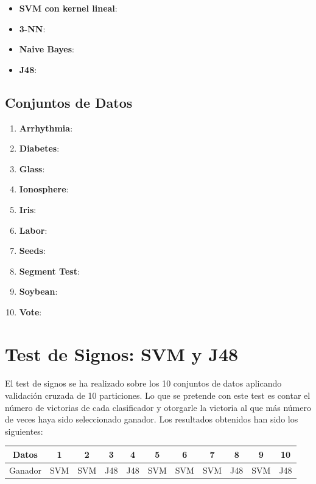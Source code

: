 \documentclass[10pt, a4paper,spanish]{article}
\begin{document}
			\begin{itemize}
				\item \textbf{SVM con kernel lineal}:
				\item \textbf{3-NN}:
				\item \textbf{Naive Bayes}:
				\item \textbf{J48}:
			\end{itemize}

		\subsection{Conjuntos de Datos}

			\begin{enumerate}
				\item \textbf{Arrhythmia}:
				\item \textbf{Diabetes}:
				\item \textbf{Glass}:
				\item \textbf{Ionosphere}:
				\item \textbf{Iris}:
				\item \textbf{Labor}:
				\item \textbf{Seeds}:
				\item \textbf{Segment Test}:
				\item \textbf{Soybean}:
				\item \textbf{Vote}:
			\end{enumerate}


	\section{Test de Signos: SVM y J48}

        \paragraph{}
		El test de signos se ha realizado sobre los 10 conjuntos de datos aplicando validación cruzada de 10 particiones. Lo que se pretende con este test es contar el número de victorias de cada clasificador y otorgarle la victoria al que más número de veces haya sido seleccionado ganador. Los resultados obtenidos han sido los siguientes:

		\hfill
		\begin{center}
			\begin{tabular}{ | c || c | c | c | c | c | c | c | c | c | c | }
				\hline
				Datos		& 1 	& 2		& 3 	& 4 	& 5 	& 6		& 7 	& 8 	& 9 	& 10 \\ \hline \hline
				Ganador		& SVM 	& SVM 	& J48 	& J48 	& SVM 	& SVM 	& SVM 	& J48 	& SVM 	& J48 \\
				\hline
			\end{tabular}
		\end{center}
\end{document}
